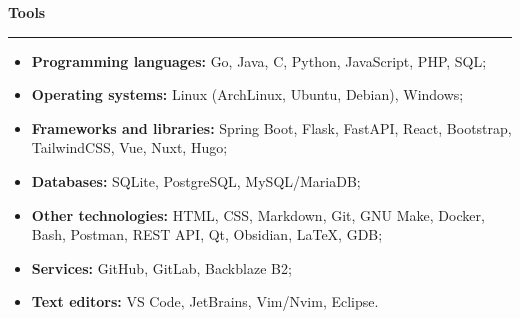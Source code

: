 {\vspace{0.5cm} \hspace{-0.5cm} \Large \textbf{Tools}}
\par\noindent\rule{\textwidth}{0.1mm}

\begin{itemize}
    \item \textbf{Programming languages:} Go, Java, C, Python, JavaScript, PHP, SQL;
    \item \textbf{Operating systems:} Linux (ArchLinux, Ubuntu, Debian), Windows;
    \item \textbf{Frameworks and libraries:} Spring Boot, Flask, FastAPI, React, Bootstrap, TailwindCSS, Vue, Nuxt, Hugo;
    \item \textbf{Databases:} SQLite, PostgreSQL, MySQL/MariaDB;
    \item \textbf{Other technologies:} HTML, CSS, Markdown, Git, GNU Make, Docker, Bash, Postman,
        REST API, Qt, Obsidian, \LaTeX, GDB;
    \item \textbf{Services:} GitHub, GitLab, Backblaze B2; 
    \item \textbf{Text editors:} VS Code, JetBrains, Vim/Nvim, Eclipse.
\end{itemize}
